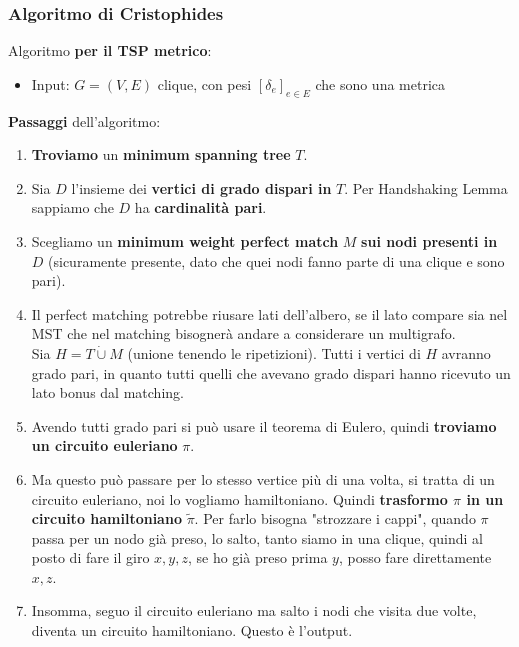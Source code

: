 \newpage

\subsubsection{Algoritmo di Cristophides}

Algoritmo \textbf{per il TSP metrico}:
\begin{itemize}
	\item Input: $G = (V,E)$ clique, con pesi $[\delta_e]_{e \in E}$ che sono una metrica
\end{itemize}

\textbf{Passaggi} dell'algoritmo:
\begin{enumerate}
	\item \textbf{Troviamo} un \textbf{minimum spanning tree} $T$.\\
	
	\item Sia $D$ l'insieme dei \textbf{vertici di grado dispari in} $T$. Per Handshaking Lemma sappiamo che $D$ ha \textbf{cardinalità pari}.\\
	
	\item Scegliamo un \textbf{minimum weight perfect match} $M$ \textbf{sui nodi presenti in} $D$ (sicuramente presente, dato che quei nodi fanno parte di una clique e sono pari). 
	
	\item Il perfect matching potrebbe riusare lati dell'albero, se il lato compare sia nel MST che nel matching bisognerà andare a considerare un multigrafo. \\
	Sia $H = T \dot{\cup} M$ (unione tenendo le ripetizioni). Tutti i vertici di $H$ avranno grado pari, in quanto tutti quelli che avevano grado dispari hanno ricevuto un lato bonus dal matching.\\
	
	\item Avendo tutti grado pari si può usare il teorema di Eulero, quindi \textbf{troviamo un circuito euleriano} $\pi$.\\
	
	\item Ma questo può passare per lo stesso vertice più di una volta, si tratta di un circuito euleriano, noi lo vogliamo hamiltoniano. Quindi \textbf{trasformo $\pi$ in un circuito hamiltoniano} $\tilde \pi$. Per farlo bisogna "strozzare i cappi", quando $\pi$ passa per un nodo già preso, lo salto, tanto siamo in una clique, quindi al posto di fare il giro $x, y, z$, se ho già preso prima $y$, posso fare direttamente $x,z$.\\
	
	\item Insomma, seguo il circuito euleriano ma salto i nodi che visita due volte, diventa un circuito hamiltoniano. Questo è l'output.\\
\end{enumerate}

